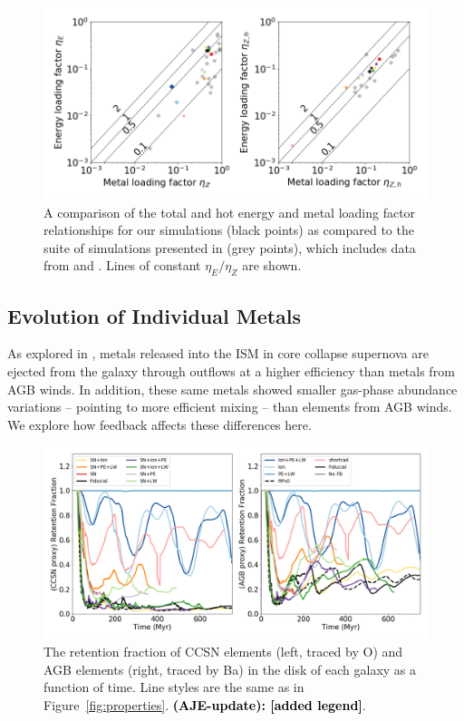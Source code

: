 \documentclass[twocolumn]{aastex62}
\newcommand{\changed}[1]{\textcolor{black}{\textbf{(AJE-update): #1}}}
\begin{document}
\begin{figure}
  \centering
  \includegraphics[width=0.95\linewidth]{figures/phys_comparison_E_loading_Z_loading}
  \caption{A comparison of the total and hot energy and metal loading factor relationships for our simulations (black points) as compared to the suite of simulations presented in \citet{LiBryan2020} (grey points), which includes data from \citet{Li2017,KimOstriker2018,Fielding2018,Hu2018,Armillotta2019,Martizzi2016} and \citet{Creasey2015}. Lines of constant $\eta_E / \eta_Z$ are shown.}
  \label{fig:loading_relation}
\end{figure}

\subsection{Evolution of Individual Metals}
\label{sec:metals}

As explored in \citep{Emerick2018b}, metals released into the ISM in core collapse supernova are ejected from the galaxy through outflows at a higher efficiency than metals from AGB winds. In addition, these same metals showed smaller gas-phase abundance variations -- pointing to more efficient mixing -- than elements from AGB winds. We explore how feedback affects these differences here.

\begin{figure}
  \centering
  \includegraphics[width=0.95\linewidth]{figures/physics_comparison_retention}
  \caption{The retention fraction of CCSN elements (left, traced by O) and AGB elements (right, traced by Ba) in the disk of each galaxy as a function of time. Line styles are the same as in Figure~\ref{fig:properties}. \changed{[added legend]}.}
  \label{fig:retention}
\end{figure}
\end{document}
